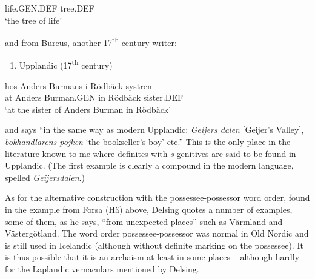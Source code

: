 life.GEN.DEF  tree.DEF\\ %


 ‘the tree of life’
\z


and from Bureus, another 17\textsuperscript{th} century writer:

\begin{enumerate} %
\item 
Upplandic (17\textsuperscript{th} century)
\end{enumerate} %
\ea\label{}
\gll hos  Anders  Burmans  i  Rödbäck  systren\\


at  Anders  Burman.GEN  in  Rödbäck  sister.DEF\\ %


‘at the sister of Anders Burman in Rödbäck’
\z


and says “in the same way as modern Upplandic: \textit{Geijers dalen }[Geijer’s Valley], \textit{bokhandlarens pojken} ‘the bookseller’s boy’ etc.” This is the only place in the literature known to me where definites with \textit{s}{}-genitives are said to be found in Upplandic. (The first example is clearly a compound in the modern language, spelled \textit{Geijersdalen}.)

As for the alternative construction with the possessee-possessor word order, found in the example from Forsa (Hä) above, Delsing quotes a number of examples, some of them, as he says, “from unexpected places” such as Värmland and Västergötland. The word order possessee-possessor was normal in Old Nordic and is still used in Icelandic (although without definite marking on the possessee). It is thus possible that it is an archaism at least in some places – although hardly for the Laplandic vernaculars mentioned by Delsing.

